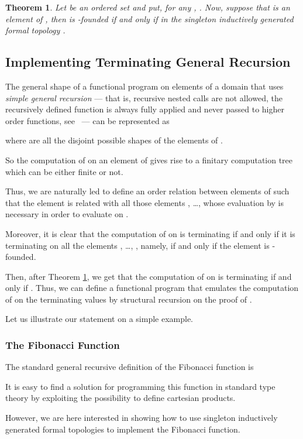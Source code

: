 \documentclass[copyright,creativecommons]{eptcs}
\newtheorem{theorem}[definition]{Theorem}
\begin{document}
\begin{theorem}
\label{thMain}
Let  be an ordered set and put, for any , .
Now, suppose that  is an element of , then
 is -founded if and only if  in the singleton inductively
generated formal topology .
\end{theorem}

\subsection{Implementing Terminating General Recursion}

The general shape of a functional program  on elements of a domain  that uses 
\emph{simple general recursion} --- that is, recursive nested calls are not
allowed, the recursively defined function is always fully applied and never
passed to higher order functions, see~\cite{BC05} --- can be represented as
 
where  are all the disjoint possible shapes of the elements of .

So the computation of  on an element of  gives rise to a finitary computation tree which can 
be either finite or not.

Thus, we are naturally led to define an order relation  between elements of  such that the 
element  is related with all those elements , \ldots,  whose 
evaluation by  is necessary in order to evaluate  on .

Moreover, it is clear that the computation of  on  is terminating if and only if it is terminating
on all the elements , \ldots, , namely, if and only if the element
 is -founded.

Then, after Theorem \ref{thMain}, we get that the computation of  on  is terminating if and only if
.
Thus, we can define a functional program that emulates the computation of  on the terminating values
by structural recursion on the proof of .

Let us illustrate our statement on a simple example.

\subsubsection{The Fibonacci Function}

The standard general recursive definition of the Fibonacci function is

It is easy to find a solution for programming this function in standard type theory by exploiting the possibility
to define cartesian products.

However, we are here interested in showing how to use singleton inductively generated formal topologies
to implement the Fibonacci function.
\end{document}
